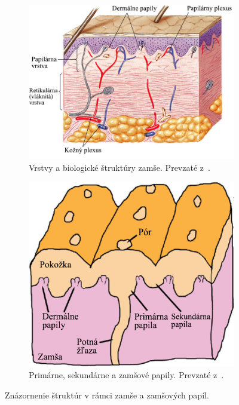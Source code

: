   \begin{figure}[h]\centering
    \centering
    \begin{subfigure}[b]{0.54\linewidth}
      \includegraphics[width=\linewidth]{obrazky-figures/zamsa.png}
      \caption{Vrstvy a biologické štruktúry zamše. Prevzaté z~{\cite{droual_dermis}}.}
      \label{obr:zamsa_a_papily/zamsa}
    \end{subfigure}
    \hfill
    \begin{subfigure}[b]{0.44\linewidth}
      \includegraphics[width=\linewidth]{obrazky-figures/papily_prierez.png}
      \caption{Primárne, sekundárne a zamšové papily. Prevzaté z~{\cite{FingerprintSrcBook}}.}
      \label{obr:zamsa_a_papily/papily_prierez}
    \end{subfigure}
    \caption{Znázornenie štruktúr v rámci zamše a zamšových papíl.}
    \label{obr:zamsa_a_papily}
  \end{figure}
  
